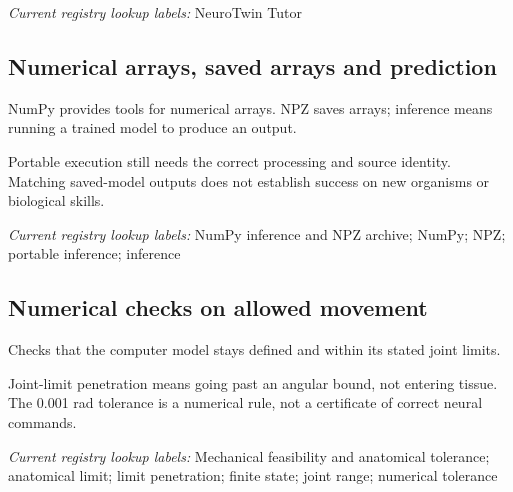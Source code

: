 \noindent\textit{Current registry lookup labels:} NeuroTwin Tutor\par

\begin{samepage}
\subsection*{Numerical arrays, saved arrays and prediction}
\noindent NumPy provides tools for numerical arrays. NPZ saves arrays; inference means running a trained model to produce an output.\par
\end{samepage}
\begin{samepage}
\noindent Portable execution still needs the correct processing and source identity. Matching saved-model outputs does not establish success on new organisms or biological skills.\par\nopagebreak[4]

\end{samepage}


\noindent\textit{Current registry lookup labels:} NumPy inference and NPZ archive; NumPy; NPZ; portable inference; inference\par

\begin{samepage}
\subsection*{Numerical checks on allowed movement}
\noindent Checks that the computer model stays defined and within its stated joint limits.\par
\end{samepage}
\begin{samepage}
\noindent Joint-limit penetration means going past an angular bound, not entering tissue. The 0.001 rad tolerance is a numerical rule, not a certificate of correct neural commands.\par\nopagebreak[4]

\end{samepage}


\noindent\textit{Current registry lookup labels:} Mechanical feasibility and anatomical tolerance; anatomical limit; limit penetration; finite state; joint range; numerical tolerance\par

